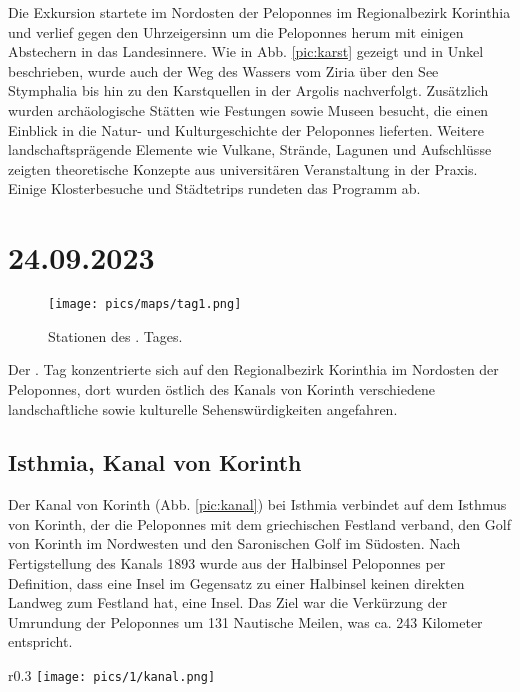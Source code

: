 \documentclass[preprint]{geomorphica} %
\begin{document}
Die Exkursion startete im Nordosten der Peloponnes im Regionalbezirk Korinthia und verlief gegen den Uhrzeigersinn um die Peloponnes herum mit einigen Abstechern in das Landesinnere. Wie in Abb. \ref{pic:karst} gezeigt und in Unkel \cite{unkelHydraHermesHerkules2020} beschrieben, wurde auch der Weg des Wassers vom Ziria über den See Stymphalia bis hin zu den Karstquellen in der Argolis nachverfolgt. Zusätzlich wurden archäologische Stätten wie Festungen sowie Museen besucht, die einen Einblick in die Natur- und Kulturgeschichte der Peloponnes lieferten. Weitere landschaftsprägende Elemente wie Vulkane, Strände, Lagunen und Aufschlüsse zeigten theoretische Konzepte aus universitären Veranstaltung in der Praxis. Einige Klosterbesuche und Städtetrips rundeten das Programm ab. 


\section{24.09.2023}

\begin{figure}[!h]
    \vspace{-5mm}
    \centering
    \texttt{[image: pics/maps/tag1.png]}
    \caption{Stationen des \theday. Tages.}
    \label{pic:tag1}
\end{figure}

Der \theday. Tag konzentrierte sich auf den Regionalbezirk Korinthia im Nordosten der Peloponnes, dort wurden östlich des Kanals von Korinth verschiedene landschaftliche sowie kulturelle Sehenswürdigkeiten angefahren.

\subsection{Isthmia, Kanal von Korinth}

Der Kanal von Korinth (Abb. \ref{pic:kanal}) bei Isthmia verbindet auf dem Isthmus von Korinth, der die Peloponnes mit dem griechischen Festland verband, den Golf von Korinth im Nordwesten und den Saronischen Golf im Südosten. Nach Fertigstellung des Kanals 1893 wurde aus der Halbinsel Peloponnes per Definition, dass eine Insel im Gegensatz zu einer Halbinsel keinen direkten Landweg zum Festland hat, eine Insel. Das Ziel war die Verkürzung der Umrundung der Peloponnes um 131 Nautische Meilen, was ca. 243 Kilometer entspricht.

\begin{wrapfigure}{r}{0.3\textwidth}
    \centering
    \texttt{[image: pics/1/kanal.png]}
    \caption{Kanal von Korinth Richtung Saronischer Golf.}
    \label{pic:kanal}
\end{wrapfigure}
\end{document}
